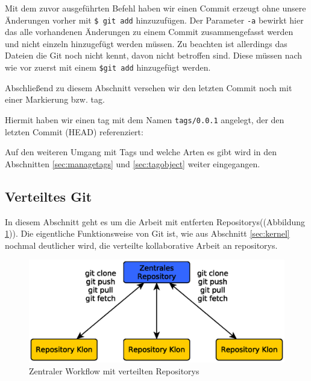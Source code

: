 Mit dem zuvor ausgeführten Befehl haben wir einen Commit erzeugt ohne unsere
Änderungen vorher mit \texttt{\$ git add} hinzuzufügen. Der Parameter
\texttt{-a} bewirkt hier das alle vorhandenen Änderungen zu einem Commit
zusammengefasst werden und nicht einzeln hinzugefügt werden müssen. Zu beachten
ist allerdings das Dateien die Git noch nicht kennt, davon nicht betroffen
sind. Diese müssen nach wie vor zuerst mit einem \texttt{\$git add} hinzugefügt
werden.

Abschließend zu diesem Abschnitt versehen wir den letzten Commit noch mit einer
Markierung bzw. \gls{tag}.



Hiermit haben wir einen \gls{tag} mit dem Namen \texttt{tags/0.0.1} angelegt,
der den letzten Commit (\gls{HEAD}) referenziert:



Auf den weiteren Umgang mit Tags und welche Arten es gibt wird in den
Abschnitten \ref{sec:managetags} und \ref{sec:tagobject} weiter eingegangen.

\subsection{Verteiltes Git}\label{sec:distributed}
In diesem Abschnitt geht es um die Arbeit mit entferten Repositorys((Abbildung
\ref{fig:centralworkflow})). Die eigentliche Funktionsweise von Git ist, wie
aus Abschnitt \ref{sec:kernel} nochmal deutlicher wird, die verteilte
kollaborative Arbeit an \glspl{repository}.

\begin{figure}[h]
  \centering
  \includegraphics[scale=0.70]{images/workflow.eps}
  \caption{Zentraler Workflow mit verteilten Repositorys\cite[S.~138]{gitosp}}
  \label{fig:centralworkflow}
\end{figure}

